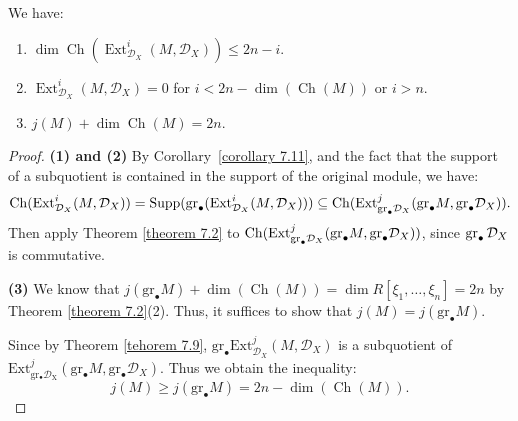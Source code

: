 \begin{theorem}\label{theorem 7.12}
    We have:
    \begin{enumerate}
        \item $\dim \operatorname{Ch}(\operatorname{Ext}_{\mathcal{D}_X}^i(M, \mathcal{D}_X)) \leq 2n - i$.
        \item $\operatorname{Ext}_{\mathcal{D}_X}^i(M, \mathcal{D}_X) = 0$ for $i < 2n - \dim(\operatorname{Ch}(M))$ or $i > n$.
        \item $j(M) + \dim \operatorname{Ch}(M) = 2n$.
    \end{enumerate}
\end{theorem}
\begin{proof}
    \textbf{(1) and (2)}
    By Corollary~\ref{corollary 7.11}, and the fact that the support of a subquotient is contained in the support of the original module, we have:
    $$ \operatorname{Ch}(\operatorname{Ext}_{\mathcal{D}_X}^i(M, \mathcal{D}_X)) = \operatorname{Supp}(\operatorname{gr}_{\bullet}(\operatorname{Ext}_{\mathcal{D}_X}^i(M, \mathcal{D}_X))) \subseteq \operatorname{Ch}(\mathrm{Ext}^{j}_{\mathrm{gr}_{\bullet}\mathcal{D}_{X}}(\mathrm{gr}_{\bullet}M,\mathrm{gr}_{\bullet}\mathcal{D}_{X})). $$
    Then apply Theorem \ref{theorem 7.2} to $\operatorname{Ch}(\mathrm{Ext}^{j}_{\mathrm{gr}_{\bullet}\mathcal{D}_{X}}(\mathrm{gr}_{\bullet}M,\mathrm{gr}_{\bullet}\mathcal{D}_{X}))$, since $\operatorname{gr}_{\bullet}\mathcal{D}_{X}$ is commutative.

    \medskip

    \textbf{(3)}  We know that $j(\mathrm{gr}_{\bullet}M)+\dim(\operatorname{Ch}(M)) = \dim R[\xi_{1},\dots,\xi_{n}] = 2n$ by Theorem \ref{theorem 7.2}(2). Thus, it suffices to show that $j(M)=j(\mathrm{gr}_{\bullet}M)$.

    Since by Theorem \ref{tehorem 7.9}, $\mathrm{gr}_{\bullet}\mathrm{Ext}_{\mathcal{D}_{X}}^{j}(M,\mathcal{D}_{X})$ is a subquotient of $\mathrm{Ext}^{j}_{\mathrm{gr_{\bullet}\mathcal{D}_{X}}}(\mathrm{gr}_{\bullet}M,\mathrm{gr}_{\bullet}\mathcal{D}_{X})$.
    Thus we obtain the inequality:
    \[
        j(M) \ge j(\mathrm{gr}_{\bullet}M) = 2n - \dim(\operatorname{Ch}(M)).
    \]


\end{proof}
